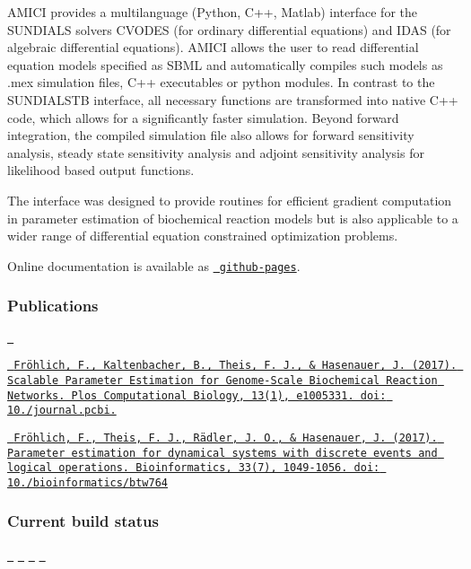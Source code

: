 A\+M\+I\+CI provides a multilanguage (Python, C++, Matlab) interface for the S\+U\+N\+D\+I\+A\+LS solvers C\+V\+O\+D\+ES (for ordinary differential equations) and I\+D\+AS (for algebraic differential equations). A\+M\+I\+CI allows the user to read differential equation models specified as S\+B\+ML and automatically compiles such models as .mex simulation files, C++ executables or python modules. In contrast to the S\+U\+N\+D\+I\+A\+L\+S\+TB interface, all necessary functions are transformed into native C++ code, which allows for a significantly faster simulation. Beyond forward integration, the compiled simulation file also allows for forward sensitivity analysis, steady state sensitivity analysis and adjoint sensitivity analysis for likelihood based output functions.

The interface was designed to provide routines for efficient gradient computation in parameter estimation of biochemical reaction models but is also applicable to a wider range of differential equation constrained optimization problems.

Online documentation is available as \href{http://icb-dcm.github.io/AMICI/}{\texttt{ github-\/pages}}.

\subsubsection*{Publications}

\href{https://zenodo.org/badge/latestdoi/43677177}{\texttt{ }}

\href{https://doi.org/10.1371/journal.pcbi.1005331}{\texttt{ Fröhlich, F., Kaltenbacher, B., Theis, F. J., \& Hasenauer, J. (2017). Scalable Parameter Estimation for Genome-\/\+Scale Biochemical Reaction Networks. Plos Computational Biology, 13(1), e1005331. doi\+: 10./journal.pcbi.}}

\href{https://doi.org/10.1093/bioinformatics/btw764}{\texttt{ Fröhlich, F., Theis, F. J., Rädler, J. O., \& Hasenauer, J. (2017). Parameter estimation for dynamical systems with discrete events and logical operations. Bioinformatics, 33(7), 1049-\/1056. doi\+: 10./bioinformatics/btw764}}

\subsubsection*{Current build status}

\href{https://badge.fury.io/py/amici}{\texttt{ }} \href{https://travis-ci.org/ICB-DCM/AMICI}{\texttt{ }} \href{https://codecov.io/gh/ICB-DCM/AMICI}{\texttt{ }} \href{https://www.codacy.com/app/FFroehlich/AMICI?utm_source=github.com&amp;utm_medium=referral&amp;utm_content=ICB-DCM/AMICI&amp;utm_campaign=Badge_Grade}{\texttt{ }} 